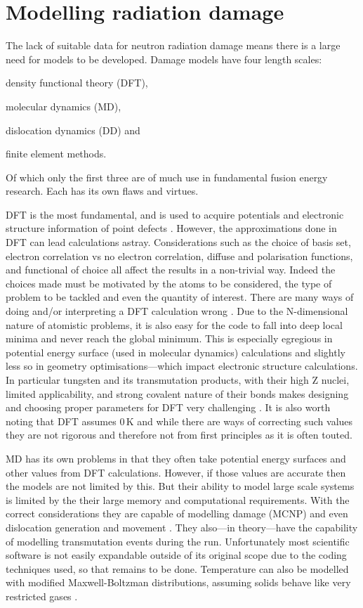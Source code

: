\documentclass[12pt, a4paper]{article}
\begin{document}
	\section{Modelling radiation damage}
		The lack of suitable data for neutron radiation damage means there is a large need for models to be developed. Damage models have four length scales: 
		\begin{inparaenum}
			 \item density functional theory (DFT), 
			 \item molecular dynamics (MD),
			 \item dislocation dynamics (DD) and
			 \item finite element methods.
		\end{inparaenum} 
		Of which only the first three are of much use in fundamental fusion energy research. Each has its own flaws and virtues.
		
		DFT is the most fundamental, and is used to acquire potentials and electronic structure information of point defects \cite{dftwhe}. However, the approximations done in DFT can lead calculations astray. Considerations such as the choice of basis set, electron correlation vs no electron correlation, diffuse and polarisation functions, and functional of choice all affect the results in a non-trivial way. Indeed the choices made must be motivated by the atoms to be considered, the type of problem to be tackled and even the quantity of interest. There are many ways of doing and/or interpreting a DFT calculation wrong \cite{dftintro}. Due to the N-dimensional nature of atomistic problems, it is also easy for the code to fall into deep local minima and never reach the global minimum. This is especially egregious in potential energy surface (used in molecular dynamics) calculations \cite{pescalc} and slightly less so in geometry optimisations---which impact electronic structure calculations. In particular tungsten and its transmutation products, with their high Z nuclei, limited applicability, and strong covalent nature of their bonds makes designing and choosing proper parameters for DFT very challenging \cite{3rdrowbasis}. It is also worth noting that DFT assumes $0\,\textrm{K}$ and while there are ways of correcting such values they are not rigorous and therefore not from first principles as it is often touted.
		
		MD has its own problems in that they often take potential energy surfaces and other values from DFT calculations. However, if those values are accurate then the models are not limited by this. But their ability to model large scale systems is limited by the their large memory and computational requirements. With the correct considerations they are capable of modelling damage (MCNP)\cite{mcnp} and even dislocation generation and movement \cite{mddis}. They also---in theory---have the capability of modelling transmutation events during the run. Unfortunately most scientific software is not easily expandable outside of its original scope due to the coding techniques used, so that remains to be done. Temperature can also be modelled with modified Maxwell-Boltzman distributions, assuming solids behave like very restricted gases \cite{mxbmd}.
		
\end{document}
